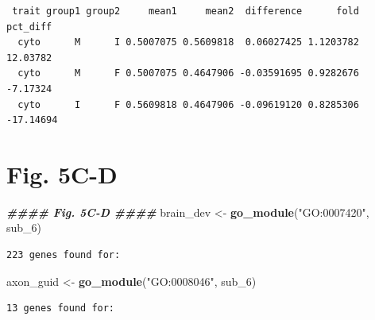 \documentclass[
  landscape]{article}
\newenvironment{Shaded}{\begin{snugshade}}{\end{snugshade}}
\newcommand{\DocumentationTok}[1]{\textcolor[rgb]{0.56,0.35,0.01}{\textbf{\textit{#1}}}}
\newcommand{\FunctionTok}[1]{\textcolor[rgb]{0.13,0.29,0.53}{\textbf{#1}}}
\newcommand{\NormalTok}[1]{#1}
\newcommand{\OtherTok}[1]{\textcolor[rgb]{0.56,0.35,0.01}{#1}}
\newcommand{\StringTok}[1]{\textcolor[rgb]{0.31,0.60,0.02}{#1}}
\begin{document}
\begin{verbatim}
 trait group1 group2     mean1     mean2  difference      fold  pct_diff
  cyto      M      I 0.5007075 0.5609818  0.06027425 1.1203782  12.03782
  cyto      M      F 0.5007075 0.4647906 -0.03591695 0.9282676  -7.17324
  cyto      I      F 0.5609818 0.4647906 -0.09619120 0.8285306 -17.14694
\end{verbatim}

\section{Fig. 5C-D}\label{fig.-5c-d}

\begin{Shaded}
\begin{Highlighting}[]
\DocumentationTok{\#\#\#\# Fig. 5C{-}D \#\#\#\#}
\NormalTok{brain\_dev }\OtherTok{\textless{}{-}} \FunctionTok{go\_module}\NormalTok{(}\StringTok{"GO:0007420"}\NormalTok{, sub\_6)}
\end{Highlighting}
\end{Shaded}

\begin{verbatim}
223 genes found for: 
\end{verbatim}

\begin{Shaded}
\begin{Highlighting}[]
\NormalTok{axon\_guid }\OtherTok{\textless{}{-}} \FunctionTok{go\_module}\NormalTok{(}\StringTok{"GO:0008046"}\NormalTok{, sub\_6)}
\end{Highlighting}
\end{Shaded}

\begin{verbatim}
13 genes found for: 
\end{verbatim}
\end{document}
